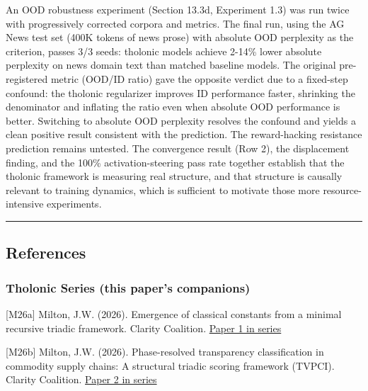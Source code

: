 \documentclass[
  11pt,
  letterpaper,
]{article}
\begin{document}
An OOD robustness experiment (Section 13.3d, Experiment 1.3) was run
twice with progressively corrected corpora and metrics. The final run,
using the AG News test set (400K tokens of news prose) with absolute OOD
perplexity as the criterion, passes 3/3 seeds: tholonic models achieve
2-14\% lower absolute perplexity on news domain text than matched
baseline models. The original pre-registered metric (OOD/ID ratio) gave
the opposite verdict due to a fixed-step confound: the tholonic
regularizer improves ID performance faster, shrinking the denominator
and inflating the ratio even when absolute OOD performance is better.
Switching to absolute OOD perplexity resolves the confound and yields a
clean positive result consistent with the prediction. The reward-hacking
resistance prediction remains untested. The convergence result (Row 2),
the displacement finding, and the 100\% activation-steering pass rate
together establish that the tholonic framework is measuring real
structure, and that structure is causally relevant to training dynamics,
which is sufficient to motivate those more resource-intensive
experiments.

\begin{center}\rule{0.5\linewidth}{0.5pt}\end{center}

\subsection{References}\label{references}

\subsubsection{Tholonic Series (this paper's
companions)}\label{tholonic-series-this-papers-companions}

{[}M26a{]} Milton, J.W. (2026). Emergence of classical constants from a
minimal recursive triadic framework. Clarity Coalition.
\href{https://github.com/baardev/truevalue/blob/main/docnav/Research/papers/1_recursive-tholonic-five-constants/1_recursive-tholonic-five-constants.pdf}{Paper
1 in series}

{[}M26b{]} Milton, J.W. (2026). Phase-resolved transparency
classification in commodity supply chains: A structural triadic scoring
framework (TVPCI). Clarity Coalition.
\href{https://github.com/baardev/truevalue/blob/main/docnav/Research/papers/2_supply-chain-transparency-tvpci/2_supply-chain-transparency-tvpci.pdf}{Paper
2 in series}
\end{document}
